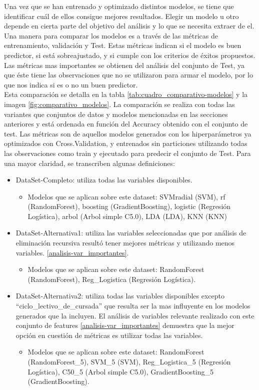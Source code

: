 Una vez que se han entrenado y optimizado distintos modelos, se tiene
que identificar cuál de ellos consigue mejores resultados. Elegir un modelo u otro depende en cierta parte del objetivo del análisis y lo que se necesita extraer de el. Una manera para comparar los modelos es a través de las métricas de entrenamiento, validación y Test. Estas métricas indican si el modelo es buen predictor, si está sobreajustado, y si cumple con los criterios de éxitos propuestos.\\

Las métricas mas importantes se obtienen del análisis del conjunto de Test, ya que éste tiene las observaciones que no se utilizaron para armar el modelo, por lo que nos indica si es o no un buen predictor.\\

Esta comparación se detalla en la tabla \ref{tab:cuadro_comparativo-modelos} y la imagen \ref{fig:comparativo_modelos}. La comparación se realiza con todas las variantes que conjuntos de datos y modelos mencionadas en las secciones anteriores y está ordenada en función del Accuracy obtenido con el conjunto de test. Las métricas son de aquellos modelos generados con los hiperparámetros ya optimizados con Cross.Validation, y entrenados sin particiones utilizando todas las observaciones como train y ejecutado para predecir el conjunto de Test. Para una mayor claridad, se transcriben algunas definiciones:

\begin{itemize}
	\item DataSet-Completo: utiliza todas las variables disponibles.
	\begin{itemize}
		\item Modelos que se aplican sobre este dataset: SVMradial (SVM), rf (RandomForest), boosting (GradientBoosting), logistic (Regresión Logística), arbol (Arbol simple C5.0), LDA (LDA), KNN (KNN)  
	\end{itemize}
	\item DataSet-Alternativa1: utiliza las variables seleccionadas que por análisis de eliminación recursiva resultó tener mejores métricas y utilizando menos variables. \ref{analisis-var_importantes}.
		\begin{itemize}
		\item Modelos que se aplican sobre este dataset: RandomForest (RandomForest), Reg\_Logistica (Regresión Logística).
	\end{itemize}
	\item DataSet-Alternativa2: utiliza todas las variables disponibles excepto ``ciclo\_lectivo\_de\_cursada'' que resulta ser la mas influyente en los modelos generados que la incluyen. El análisis de variables relevante realizado con este conjunto de features \ref{analisis-var_importantes} demuestra que la mejor opción en cuestión de métricas es utilizar todas las variables.
			\begin{itemize}
		\item Modelos que se aplican sobre este dataset: RandomForest (RandomForest\_5), SVM\_5 (SVM), Reg\_Logistica\_5 (Regresión Logística), C50\_5 (Arbol simple C5.0), GradientBoosting\_5 (GradientBoosting).
	\end{itemize}
\end{itemize}

